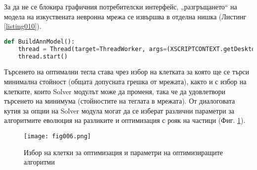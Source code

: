За да не се блокира графичния потребителски интерфейс, „разгръщането“ на модела на изкуствената невронна мрежа се извършва в отделна нишка (Листинг \ref{listing010}).

\begin{lstlisting}[caption=Изпълнение с отделна нишка, language=Python, basicstyle=\tiny, label=listing010]
def BuildAnnModel():
    thread = Thread(target=ThreadWorker, args=(XSCRIPTCONTEXT.getDesktop(),))
    thread.start()
\end{lstlisting}

Търсенето на оптимални тегла става чрез избор на клетката за която ще се търси минимална стойност (общата допусната грешка от мрежата), както и с избор на клетките, които Solver модулът може да променя, така че да удовлетвори търсенето на минимума (стойностите на теглата в мрежата). От диалоговата кутия за опции на Solver модула могат да се изберат различни параметри за алгоритмите еволюция на разликите и оптимизация с рояк на частици (Фиг. \ref{fig006}).

\begin{figure}[h]
  \centering
  \texttt{[image: fig006.png]}
  \caption{Избор на клетки за оптимизация и параметри на оптимизиращите алгоритми}
\label{fig006}
\end{figure}

